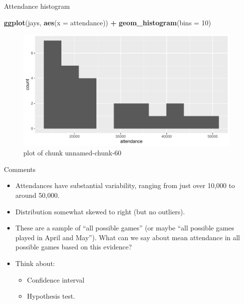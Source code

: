 \documentclass[ignorenonframetext,]{beamer}
\newenvironment{Shaded}{\begin{snugshade}}{\end{snugshade}}
\newcommand{\DataTypeTok}[1]{\textcolor[rgb]{0.13,0.29,0.53}{#1}}
\newcommand{\DecValTok}[1]{\textcolor[rgb]{0.00,0.00,0.81}{#1}}
\newcommand{\KeywordTok}[1]{\textcolor[rgb]{0.13,0.29,0.53}{\textbf{#1}}}
\newcommand{\NormalTok}[1]{#1}
\newcommand{\OperatorTok}[1]{\textcolor[rgb]{0.81,0.36,0.00}{\textbf{#1}}}
\newcommand{\StringTok}[1]{\textcolor[rgb]{0.31,0.60,0.02}{#1}}
\providecommand{\tightlist}{%
  \setlength{\itemsep}{0pt}\setlength{\parskip}{0pt}}
\begin{document}
\begin{frame}[fragile]{Attendance histogram}
\protect\hypertarget{attendance-histogram}{}

\begin{Shaded}
\begin{Highlighting}[]
\KeywordTok{ggplot}\NormalTok{(jays, }\KeywordTok{aes}\NormalTok{(}\DataTypeTok{x =}\NormalTok{ attendance)) }\OperatorTok{+}\StringTok{ }\KeywordTok{geom_histogram}\NormalTok{(}\DataTypeTok{bins =} \DecValTok{10}\NormalTok{)}
\end{Highlighting}
\end{Shaded}

\begin{figure}
\centering
\includegraphics{figure/unnamed-chunk-60-1.pdf}
\caption{plot of chunk unnamed-chunk-60}
\end{figure}

\end{frame}

\begin{frame}{Comments}
\protect\hypertarget{comments}{}

\begin{itemize}
\tightlist
\item
  Attendances have substantial variability, ranging from just over
  10,000 to around 50,000.
\item
  Distribution somewhat skewed to right (but no outliers).
\item
  These are a sample of ``all possible games'' (or maybe ``all possible
  games played in April and May''). What can we say about mean
  attendance in all possible games based on this evidence?
\item
  Think about:

  \begin{itemize}
  \tightlist
  \item
    Confidence interval
  \item
    Hypothesis test.
  \end{itemize}
\end{itemize}

\end{frame}
\end{document}
